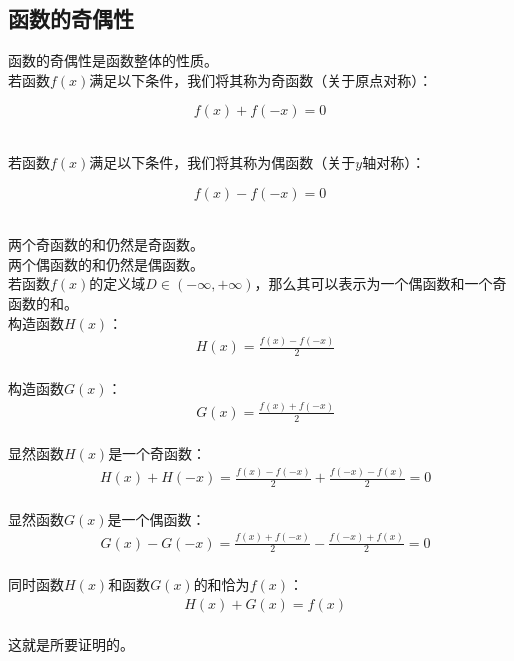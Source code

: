\documentclass[UTF8]{ctexart}
\begin{document}
\newpage

\subsection{函数的奇偶性}
    函数的奇偶性是函数整体的性质。\\[3mm]
    若函数$f(x)$满足以下条件，我们将其称为奇函数（关于原点对称）：
    \begin{large}
        \begin{equation*}
            f(x)+f(-x)=0
        \end{equation*}
    \end{large}\\
    若函数$f(x)$满足以下条件，我们将其称为偶函数（关于$y$轴对称）：
    \begin{large}
        \begin{equation*}
            f(x)-f(-x)=0
        \end{equation*}
    \end{large}\\
    两个奇函数的和仍然是奇函数。\\[3mm]
    两个偶函数的和仍然是偶函数。\\[6mm]
    \setcounter{equation}{0}
    若函数$f(x)$的定义域$D\in(-\infty,+\infty)$，那么其可以表示为一个偶函数和一个奇函数的和。\\[4mm]
    构造函数$H(x)$：
    \begin{align}
        &H(x)=\frac{f(x)-f(-x)}{2}
    \end{align}\\
    构造函数$G(x)$：
    \begin{align}
        &G(x)=\frac{f(x)+f(-x)}{2}
    \end{align}\\
    显然函数$H(x)$是一个奇函数：
    \begin{align}
        &H(x)+H(-x)=\frac{f(x)-f(-x)}{2}+\frac{f(-x)-f(x)}{2}=0
    \end{align}\\
    显然函数$G(x)$是一个偶函数：
    \begin{align}
        &G(x)-G(-x)=\frac{f(x)+f(-x)}{2}-\frac{f(-x)+f(x)}{2}=0
    \end{align}\\
    同时函数$H(x)$和函数$G(x)$的和恰为$f(x)$：
    \begin{align}
        &H(x)+G(x)=f(x)
    \end{align}\\
    这就是所要证明的。
\end{document}
